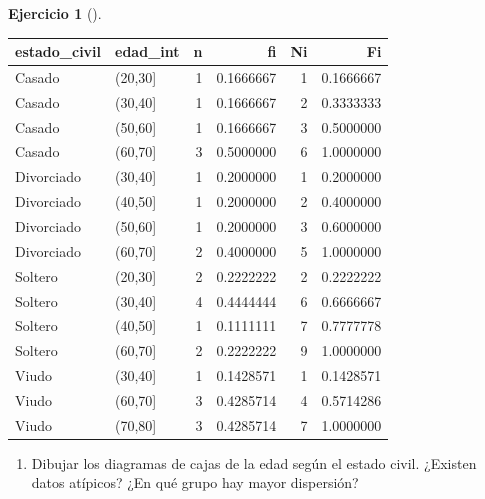 \documentclass[
  a4paper,
]{scrreport}
\providecommand{\tightlist}{%
  \setlength{\itemsep}{0pt}\setlength{\parskip}{0pt}}\usepackage{longtable,booktabs,array}
\theoremstyle{definition}
\newtheorem{exercise}{Ejercicio}[chapter]
\theoremstyle{remark}
\begin{document}
\begin{exercise}[]
\begin{tcolorbox}
\begin{tabular}{l|l|r|r|r|r}
\hline
estado\_civil & edad\_int & n & fi & Ni & Fi\\
\hline
Casado & (20,30] & 1 & 0.1666667 & 1 & 0.1666667\\
\hline
Casado & (30,40] & 1 & 0.1666667 & 2 & 0.3333333\\
\hline
Casado & (50,60] & 1 & 0.1666667 & 3 & 0.5000000\\
\hline
Casado & (60,70] & 3 & 0.5000000 & 6 & 1.0000000\\
\hline
Divorciado & (30,40] & 1 & 0.2000000 & 1 & 0.2000000\\
\hline
Divorciado & (40,50] & 1 & 0.2000000 & 2 & 0.4000000\\
\hline
Divorciado & (50,60] & 1 & 0.2000000 & 3 & 0.6000000\\
\hline
Divorciado & (60,70] & 2 & 0.4000000 & 5 & 1.0000000\\
\hline
Soltero & (20,30] & 2 & 0.2222222 & 2 & 0.2222222\\
\hline
Soltero & (30,40] & 4 & 0.4444444 & 6 & 0.6666667\\
\hline
Soltero & (40,50] & 1 & 0.1111111 & 7 & 0.7777778\\
\hline
Soltero & (60,70] & 2 & 0.2222222 & 9 & 1.0000000\\
\hline
Viudo & (30,40] & 1 & 0.1428571 & 1 & 0.1428571\\
\hline
Viudo & (60,70] & 3 & 0.4285714 & 4 & 0.5714286\\
\hline
Viudo & (70,80] & 3 & 0.4285714 & 7 & 1.0000000\\
\hline
\end{tabular}

\end{tcolorbox}

\begin{enumerate}
\def\labelenumi{\alph{enumi}.}
\setcounter{enumi}{2}
\tightlist
\item
  Dibujar los diagramas de cajas de la edad según el estado civil.
  ¿Existen datos atípicos? ¿En qué grupo hay mayor dispersión?
\end{enumerate}

\begin{tcolorbox}[enhanced jigsaw, coltitle=black, breakable, bottomtitle=1mm, colbacktitle=quarto-callout-tip-color!10!white, rightrule=.15mm, opacityback=0, opacitybacktitle=0.6, left=2mm, colframe=quarto-callout-tip-color-frame, title=\textcolor{quarto-callout-tip-color}{\faLightbulb}\hspace{0.5em}{Solución}, toprule=.15mm, toptitle=1mm, arc=.35mm, colback=white, titlerule=0mm, bottomrule=.15mm, leftrule=.75mm]


\end{tcolorbox}
\end{exercise}
\end{document}
